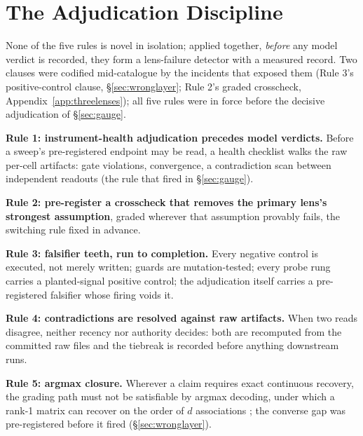 \section{The Adjudication Discipline}
\label{sec:discipline}

None of the five rules is novel in isolation; applied together,
\emph{before} any model verdict is recorded, they form a lens-failure
detector with a measured record. Two clauses were codified
mid-catalogue by the incidents that exposed them (Rule 3's
positive-control clause, \S\ref{sec:wronglayer}; Rule 2's graded
crosscheck, Appendix~\ref{app:threelenses}); all five rules were in
force before the decisive adjudication of \S\ref{sec:gauge}.

\textbf{Rule 1: instrument-health adjudication precedes model
verdicts.} Before a sweep's pre-registered endpoint may be read, a
health checklist walks the raw per-cell artifacts: gate violations,
convergence, a contradiction scan between independent readouts (the
rule that fired in \S\ref{sec:gauge}).

\textbf{Rule 2: pre-register a crosscheck that removes the primary
lens's strongest assumption}, graded wherever that assumption provably
fails, the switching rule fixed in advance.

\textbf{Rule 3: falsifier teeth, run to completion.} Every negative
control is executed, not merely written; guards are mutation-tested;
every probe rung carries a planted-signal positive control; the
adjudication itself carries a pre-registered falsifier whose firing
voids it.

\textbf{Rule 4: contradictions are resolved against raw artifacts.}
When two reads disagree, neither recency nor authority decides: both
are recomputed from the committed raw files and the tiebreak is
recorded before anything downstream runs.

\textbf{Rule 5: argmax closure.} Wherever a claim requires exact
continuous recovery, the grading path must not be satisfiable by
argmax decoding, under which a rank-1 matrix can recover on the order
of $d$ associations \citep{nichani2025factual}; the converse gap was
pre-registered before it fired (\S\ref{sec:wronglayer}).
